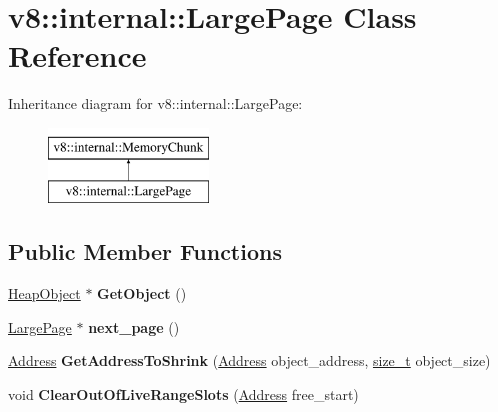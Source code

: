 \hypertarget{classv8_1_1internal_1_1LargePage}{}\section{v8\+:\+:internal\+:\+:Large\+Page Class Reference}
\label{classv8_1_1internal_1_1LargePage}
Inheritance diagram for v8\+:\+:internal\+:\+:Large\+Page\+:\begin{figure}[H]
\begin{center}
\leavevmode
\includegraphics[height=2.000000cm]{classv8_1_1internal_1_1LargePage}
\end{center}
\end{figure}
\subsection*{Public Member Functions}
\begin{DoxyCompactItemize}
\item 
\mbox{\label{classv8_1_1internal_1_1LargePage_a026fc2be5e3555b093f226c43e36e93e}} 
\mbox{\hyperlink{classv8_1_1internal_1_1HeapObject}{Heap\+Object}} $\ast$ {\bfseries Get\+Object} ()
\item 
\mbox{\label{classv8_1_1internal_1_1LargePage_a4853902bc7c2f196b3e31cfceb8c605c}} 
\mbox{\hyperlink{classv8_1_1internal_1_1LargePage}{Large\+Page}} $\ast$ {\bfseries next\+\_\+page} ()
\item 
\mbox{\label{classv8_1_1internal_1_1LargePage_aa36fc46dba4a3aca0b6eaa0c35e67a1d}} 
\mbox{\hyperlink{classuintptr__t}{Address}} {\bfseries Get\+Address\+To\+Shrink} (\mbox{\hyperlink{classuintptr__t}{Address}} object\+\_\+address, \mbox{\hyperlink{classsize__t}{size\+\_\+t}} object\+\_\+size)
\item 
\mbox{\label{classv8_1_1internal_1_1LargePage_aadbfee41a856079a299c08588c57c0dd}} 
void {\bfseries Clear\+Out\+Of\+Live\+Range\+Slots} (\mbox{\hyperlink{classuintptr__t}{Address}} free\+\_\+start)
\end{DoxyCompactItemize}
